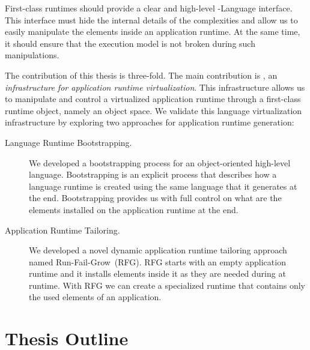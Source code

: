 First-class runtimes should provide a clear and high-level \VM-Language interface. This interface must hide the internal details of the \VM complexities and allow us to easily manipulate the elements inside an application runtime. At the same time, it should ensure that the \VM execution model is not broken during such manipulations.

The contribution of this thesis is three-fold. The main contribution is \Vtt, an \emph{infrastructure for application runtime virtualization}. This infrastructure allows us to manipulate and control a virtualized application runtime through a first-class runtime object, namely an object space.
We validate this language virtualization infrastructure by exploring two approaches for application runtime generation:
\begin{description}
\item[Language Runtime Bootstrapping.] We developed a bootstrapping process for an object-oriented high-level language. Bootstrapping is an explicit process that describes how a language runtime is created using the same language that it generates at the end. Bootstrapping provides us with full control on what are the elements installed on the application runtime at the end.
\item[Application Runtime Tailoring.] We developed a novel dynamic application runtime tailoring approach named Run-Fail-Grow~(RFG). RFG starts with an empty application runtime and it installs elements inside it as they are needed during at runtime. With RFG we can create a specialized runtime that contains only the used elements of an application.
\end{description}

\section{Thesis Outline}

\begin{description}
\item[] 

\item[] 
	
\item[] 

\item[] 

\item[] 

\end{description}



